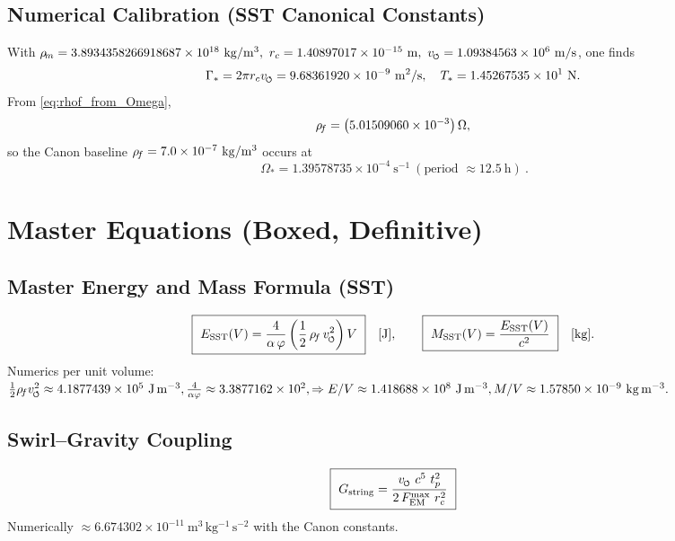 \documentclass[11pt]{article}
\begin{document}
    \subsection{Numerical Calibration (SST Canonical Constants)}
    With
    \(
    \rhom=3.8934358266918687\times10^{18}\ \mathrm{kg/m^3},\
    \rc=1.40897017\times10^{-15}\ \mathrm{m},\
    \vscore=1.09384563\times10^{6}\ \mathrm{m/s}
    \),
    one finds
    \[
        \Gamma_\ast = 2\pi \rc \vscore
        = 9.68361920\times10^{-9}\ \mathrm{m^2/s},\quad
        T_\ast = 1.45267535\times10^{1}\ \mathrm{N}.
    \]
    From \eqref{eq:rhof_from_Omega},
    \[
        \rho_{\!f} = \bigl(5.01509060\times10^{-3}\bigr)\,\Omega,
    \]
    so the Canon baseline \( \rhof=7.0\times10^{-7}\ \mathrm{kg/m^3}\) occurs at
    \[
        \boxed{\ \Omega_\ast = 1.39578735\times10^{-4}\ \mathrm{s^{-1}}\ (\text{period } \approx 12.5\ \mathrm{h})\ }.
    \]

    \section{Master Equations (Boxed, Definitive)}

    \subsection{Master Energy and Mass Formula (SST)}
    \[
        \boxed{\ E_{\text{SST}}(V) = \frac{4}{\alpha\,\varphi} \left( \frac{1}{2}\,\rhof\,\vscore^{2} \right) V\ }\quad [\text{J}],
        \qquad
        \boxed{\ M_{\text{SST}}(V) = \frac{E_{\text{SST}}(V)}{c^{2}} \ }\quad [\text{kg}].
    \]
    Numerics per unit volume:
    \(
    \tfrac12\rhof \vscore^2 \approx 4.1877439\times10^{5}\ \mathrm{J\,m^{-3}},
    \frac{4}{\alpha\varphi} \approx 3.3877162\times10^{2},
    \Rightarrow E/V \approx 1.418688\times10^{8}\ \mathrm{J\,m^{-3}},
    M/V \approx 1.57850\times10^{-9}\ \mathrm{kg\,m^{-3}}.
    \)

    \subsection{Swirl–Gravity Coupling}
    \[
        \boxed{\ G_{\text{string}} = \frac{\vscore\ c^{5}\ t_p^{2}}{2\,F_{\text{EM}}^{\max}\ \rc^{2}} \ }
    \]
    Numerically \( \approx 6.674302\times10^{-11}\ \mathrm{m^3\,kg^{-1}\,s^{-2}}\) with the Canon constants.
\end{document}
